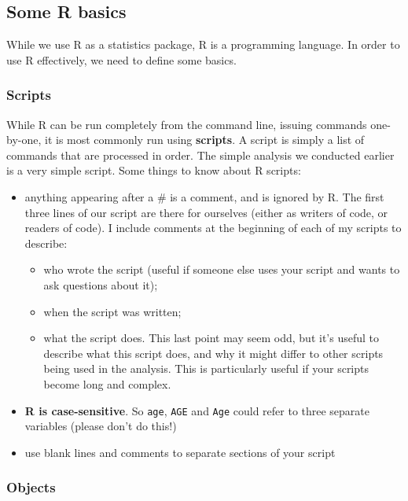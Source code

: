 \documentclass[
  a4paper,
]{memoir}
\begin{document}
\hypertarget{some-r-basics}{%
\subsection{Some R basics}\label{some-r-basics}}

While we use R as a statistics package, R is a programming language. In
order to use R effectively, we need to define some basics.

\hypertarget{scripts}{%
\subsubsection{Scripts}\label{scripts}}

While R can be run completely from the command line, issuing commands
one-by-one, it is most commonly run using \textbf{scripts}. A script is
simply a list of commands that are processed in order. The simple
analysis we conducted earlier is a very simple script. Some things to
know about R scripts:

\begin{itemize}
\item
  anything appearing after a \# is a comment, and is ignored by R. The
  first three lines of our script are there for ourselves (either as
  writers of code, or readers of code). I include comments at the
  beginning of each of my scripts to describe:

  \begin{itemize}
  \item
    who wrote the script (useful if someone else uses your script and
    wants to ask questions about it);
  \item
    when the script was written;
  \item
    what the script does. This last point may seem odd, but it's useful
    to describe what this script does, and why it might differ to other
    scripts being used in the analysis. This is particularly useful if
    your scripts become long and complex.
  \end{itemize}
\item
  \textbf{R is case-sensitive}. So \texttt{age}, \texttt{AGE} and
  \texttt{Age} could refer to three separate variables (please don't do
  this!)
\item
  use blank lines and comments to separate sections of your script
\end{itemize}

\hypertarget{objects}{%
\subsubsection{Objects}\label{objects}}
\end{document}
